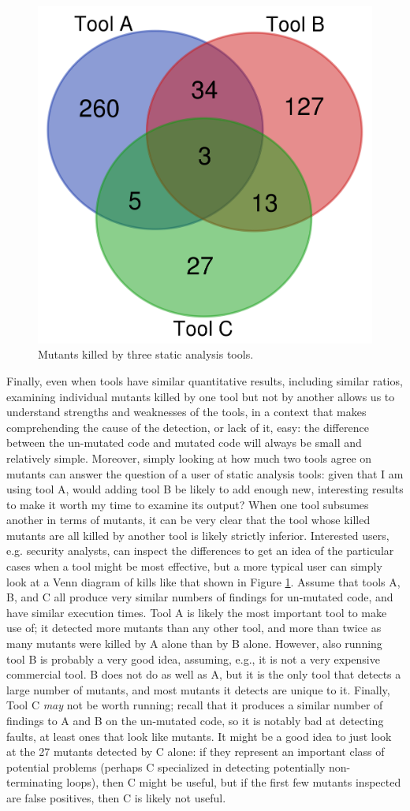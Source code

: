 \begin{figure}
  \includegraphics[width=0.35\columnwidth]{example.png}
  \caption{Mutants killed by three static analysis tools.}
  \label{fig:examplevenn}
\end{figure}

Finally, even when tools have similar quantitative results, including similar ratios, examining individual mutants killed by one tool but not by another allows us to understand strengths and weaknesses of the tools, in a context that makes comprehending the cause of the detection, or lack of it, easy: the difference between the un-mutated code and mutated code will always be small and relatively simple.  Moreover, simply looking at how much two tools agree on mutants can answer the question of a user of static analysis tools: given that I am using tool A, would adding tool B be likely to add enough new, interesting results to make it worth my time to examine its output?  When one tool subsumes another in terms of mutants, it can be very clear that the tool whose killed mutants are all killed by another tool is likely strictly inferior.  Interested users, e.g. security analysts, can inspect the differences to get an idea of the particular cases when a tool might be most effective, but a more typical user can simply look at a Venn diagram of kills like that shown in Figure \ref{fig:examplevenn}.  Assume that tools A, B, and C all produce very similar numbers of findings for un-mutated code, and have similar execution times.  Tool A is likely the most important tool to make use of; it detected more mutants than any other tool, and more than twice as many mutants were killed by A alone than by B alone.  However, also running tool B is probably a very good idea, assuming, e.g., it is not a very expensive commercial tool.  B does not do as well as A, but it is the only tool that detects a large number of mutants, and most mutants it detects are unique to it.  Finally, Tool C \emph{may} not be worth running; recall that it produces a similar number of findings to A and B on the un-mutated code, so it is notably bad at detecting faults, at least ones that look like mutants.  It might be a good idea to just look at the 27 mutants detected by C alone:  if they represent an important class of potential problems (perhaps C specialized in detecting potentially non-terminating loops), then C might be useful, but if the first few mutants inspected are false positives, then C is likely not useful.

